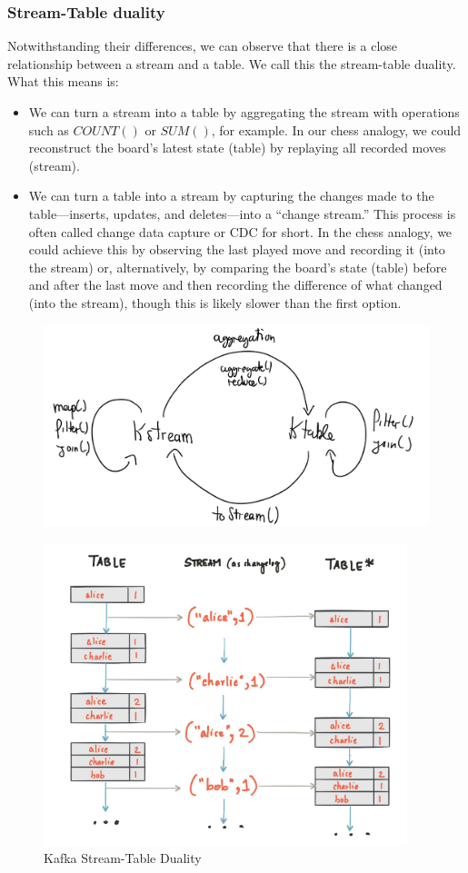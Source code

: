 \documentclass[10pt,a4paper]{article}
\begin{document}
\subsubsection{Stream-Table duality}
Notwithstanding their differences, we can observe that there is a close relationship between a stream and a table. We call this the stream-table duality. What this means is:
\begin{itemize}
	\item We can turn a stream into a table by aggregating the stream with operations such as $COUNT()$ or $SUM()$, for example. In our chess analogy, we could reconstruct the board’s latest state (table) by replaying all recorded moves (stream).
	\item We can turn a table into a stream by capturing the changes made to the table—inserts, updates, and deletes—into a “change stream.” This process is often called change data capture or CDC for short. In the chess analogy, we could achieve this by observing the last played move and recording it (into the stream) or, alternatively, by comparing the board’s state (table) before and after the last move and then recording the difference of what changed (into the stream), though this is likely slower than the first option.
\end{itemize}
\begin{figure}[ht!]
 \hfill \includegraphics[width=350pt]{images/kafka-stream-table-duality2}\hspace*{\fill}
 \end{figure}
 \pagebreak
 \begin{figure}[ht!]
 \hfill \includegraphics[width=300pt]{images/kafka-stream-table-duality}\hspace*{\fill}
 \caption{Kafka Stream-Table Duality}
\end{figure}
\pagebreak
\end{document}
